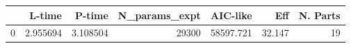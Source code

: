 \begin{tabular}{lrrrrrr}
\toprule
{} &    L-time &    P-time &  N\_params\_expt &   AIC-like &     Eff &  N. Parts \\
\midrule
0 &  2.955694 &  3.108504 &          29300 &  58597.721 &  32.147 &        19 \\
\bottomrule
\end{tabular}
